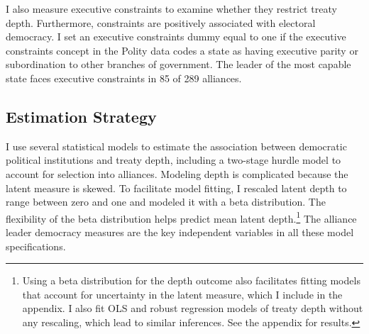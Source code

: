 \documentclass[12pt]{article}
\begin{document}
I also measure executive constraints to examine whether they restrict treaty depth. 
Furthermore, constraints are positively associated with electoral democracy.
I set an executive constraints dummy equal to one if the executive constraints concept in the Polity data codes a state as having executive parity or subordination to other branches of government.
The leader of the most capable state faces executive constraints in 85 of 289 alliances.



\subsection{Estimation Strategy}



I use several statistical models to estimate the association between democratic political institutions and treaty depth, including a two-stage hurdle model to account for selection into alliances. 
Modeling depth is complicated because the latent measure is skewed.
To facilitate model fitting, I rescaled latent depth to range between zero and one and modeled it with a beta distribution.
The flexibility of the beta distribution helps predict mean latent depth.\footnote{Using a beta distribution for the depth outcome also facilitates fitting models that account for uncertainty in the latent measure, which I include in the appendix. I also fit OLS and robust regression models of treaty depth without any rescaling, which lead to similar inferences. See the appendix for results.} 
The alliance leader democracy measures are the key independent variables in all these model specifications. 
\end{document}
